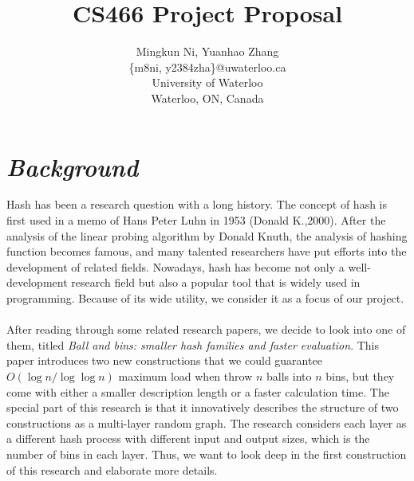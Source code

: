 \documentclass[letterpaper]{article} %
\begin{document}
	\title{CS466 Project Proposal}
	\author{Mingkun Ni, Yuanhao Zhang\\
		\{m8ni, y2384zha\}@uwaterloo.ca\\
		University of Waterloo\\
		Waterloo, ON, Canada\\
	}
	\maketitle
		
	\section{\em{Background}}
	Hash has been a research question with a long history. The concept of hash is first used in a memo of Hans Peter Luhn in 1953 (Donald K.,2000). After the analysis of the linear probing algorithm by Donald Knuth, the analysis of hashing function becomes famous, and many talented researchers have put efforts into the development of related fields. Nowadays, hash has become not only a well-development research field but also a popular tool that is widely used in programming. Because of its wide utility, we consider it as a focus of our project.\\\\
	\quad After reading through some related research papers, we decide to look into one of them, titled \textit{Ball and bins: smaller hash families and faster evaluation}. This paper introduces two new constructions that we could guarantee $O(\log n/\log\log n)$ maximum load when throw $n$ balls into $n$ bins, but they come with either a smaller description length or a faster calculation time. The special part of this research is that it innovatively describes the structure of two constructions as a multi-layer random graph. The research considers each layer as a different hash process with different input and output sizes, which is the number of bins in each layer. Thus, we want to look deep in the first construction of this research and elaborate more details.
	
\end{document}
